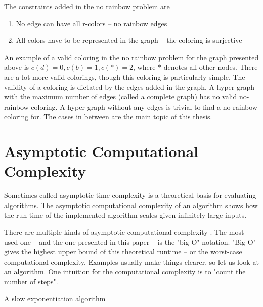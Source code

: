 \documentclass[msc,lith,english]{liuthesis}
\begin{document}
The constraints added in the no rainbow problem are
\begin{enumerate}
  \item No edge can have all r-colors -- no rainbow edges
  \item All colors have to be represented in the graph -- the coloring is surjective
\end{enumerate}

An example of a valid coloring in the no rainbow problem for the graph presented above is $c(d)=0, c(b)=1, c(*)=2$, where $*$ denotes all other nodes.
There are a lot more valid colorings, though this coloring is particularly simple.
The validity of a coloring is dictated by the edges added in the graph.
A hyper-graph with the maximum number of edges (called a complete graph) has no valid no-rainbow coloring.
A hyper-graph without any edges is trivial to find a no-rainbow coloring for.
The cases in between are the main topic of this thesis.

\cite{sourceHyper}

\section{Asymptotic Computational Complexity}
Sometimes called asymptotic time complexity is a theoretical basis for evaluating algorithms.
The asymptotic computational complexity of an algorithm shows how the run time
of the implemented algorithm scales given infinitely large inputs.


There are multiple kinds of asymptotic computational complexity \cite[Chapter 3]{sourceAlgoBook}. The most used
one -- and the one presented in this paper -- is the "big-O" notation. "Big-O"
gives the highest upper bound of this theoretical runtime -- or the worst-case
computational complexity. Examples usually make things clearer, so let us look at an algorithm.
One intuition for the computational complexity is to "count the number of steps".

\begin{algorithm}
\caption{A slow exponentiation algorithm}\label{algDivSlow}
\DontPrintSemicolon
{}

\end{algorithm}
\end{document}
